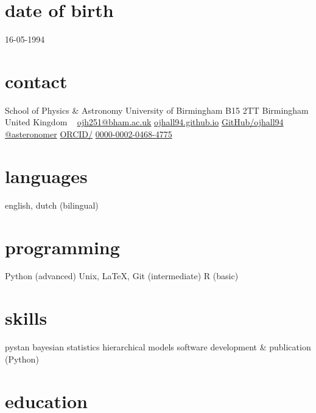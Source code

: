\documentclass[]{k-cv} %
\begin{document}


\begin{aside} %
\section{date of birth}
\color{gray}16-05-1994
\section{contact}
School of Physics \& Astronomy
University of Birmingham
B15 2TT
Birmingham
United Kingdom
~
\href{mailto:ojh251@student.bham.ac.uk}{ojh251@bham.ac.uk}
\href{http://www.ojhall94.github.io}{ojhall94.github.io}
\href{http://www.github.com/ojhall94}{GitHub/ojhall94}
\href{http://www.twitter.com/asteronomer}{@asteronomer}
\href{http://www.orcid.com/0000-0002-0468-4775}{ORCID/}
\href{http://www.orcid.com/0000-0002-0468-4775}{0000-0002-0468-4775}
\section{languages}
english, dutch (bilingual)
\section{programming}
Python (advanced)
Unix, LaTeX, Git (intermediate)
R (basic)
\section{skills}
pystan
bayesian statistics
hierarchical models
software development \& publication (Python)
\end{aside}


\section{education}
\end{document}
